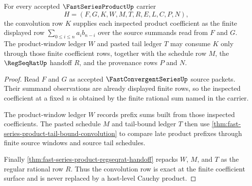 \begin{theorem}
\label{thm:fast-series-product-convolution-row-exactness}
For every accepted $\FastSeriesProductUp$ carrier
$$
H=(F,G,K,W,M,T,R,E,L,C,P,N),
$$
the convolution row $K$ supplies each inspected product coefficient as the finite displayed row $\sum_{0 \leq i \leq n} a_i b_{n-i}$ over the source summands read from $F$ and $G$. The product-window ledger $W$ and pasted tail ledger $T$ may consume $K$ only through those finite coefficient rows, together with the schedule row $M$, the $\RegSeqRatUp$ handoff $R$, and the provenance rows $P$ and $N$.
\end{theorem}
\begin{proof}
Read $F$ and $G$ as accepted $\FastConvergentSeriesUp$ source packets. Their summand observations are already displayed finite rows, so the inspected coefficient at a fixed $n$ is obtained by the finite rational sum named in the carrier.

The product-window ledger $W$ records prefix sums built from those inspected coefficients. The pasted schedule $M$ and tail-bound ledger $T$ then use \autoref{thm:fast-series-product-tail-bound-convolution} to compare late product prefixes through finite source windows and source tail schedules.

Finally \autoref{thm:fast-series-product-regseqrat-handoff} repacks $W$, $M$, and $T$ as the regular rational row $R$. Thus the convolution row is exact at the finite coefficient surface and is never replaced by a host-level Cauchy product.
\end{proof}


